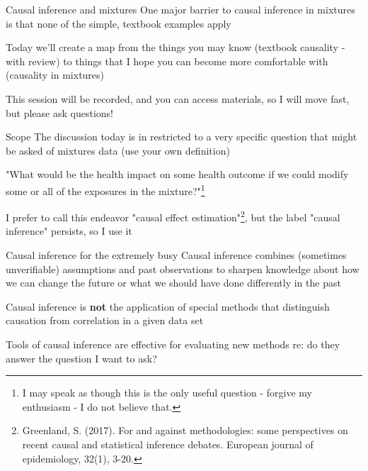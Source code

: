 \begin{frame}{Causal inference and mixtures}
	One major barrier to causal inference in mixtures is that none of the simple, textbook examples apply
	
	\bigskip
	
	Today we'll create a map from the things you may know (textbook causality - with review) to things that I hope you can become more comfortable with (causality in mixtures)
	
	\bigskip
	This session will be recorded, and you can access materials, so I will move fast, but please ask questions!
\end{frame}

\begin{frame}{Scope}
	The discussion today is in restricted to a very specific question that might be asked of mixtures data (use your own definition)
	
	\bigskip

       "What would be the health impact on some health outcome if we could modify some or all of the exposures in the mixture?"\footnote{I may speak as though this is the only useful question - forgive my enthusiasm - I do not believe that.}	
	\bigskip

      I prefer to call this endeavor "causal effect estimation"\footnote{Greenland, S. (2017). For and against methodologies: some perspectives on recent causal and statistical inference debates. European journal of epidemiology, 32(1), 3-20.}, but the label "causal inference" persists, so I use it
\end{frame}


\begin{frame}{Causal inference for the extremely busy}
	Causal inference combines (sometimes unverifiable) assumptions and past observations to sharpen knowledge about how we can change the future or what we should have done differently in the past
	
	\bigskip
	
	Causal inference is \textbf{not} the application of special methods that distinguish causation from correlation in a given data set
	\bigskip
	
	Tools of causal inference are effective for evaluating new methods re: do they answer the question I want to ask?
\end{frame}


